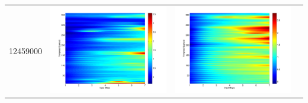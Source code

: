 \documentclass[11pt]{article}
\begin{document}
\begin{table}[H]
{\begin{tabular}{c  c   c   c  }
12459000&\begin{minipage}{.3\textwidth}\includegraphics[width=\linewidth]{resultgraph/12459000p.png}\end{minipage}
&\begin{minipage}{.3\textwidth}\includegraphics[width=\linewidth]{resultgraph/12459000pep.png}\end{minipage}

\end{tabular}}
\end{table}
\end{document}
